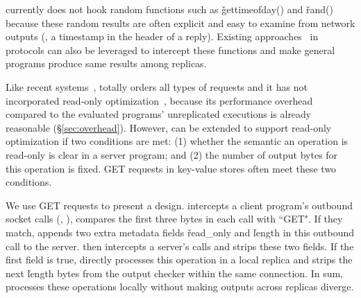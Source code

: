 
\xxx currently does not hook random functions such as \v{gettimeofday()} and 
\v{rand()} because these random results are often explicit and easy to examine 
from network outputs (\eg, a timestamp in the header of a reply). Existing 
approaches~\cite{eve:osdi12,paxos:practical} in \paxos protocols can also be 
leveraged to intercept these functions and make general programs produce same 
results among replicas.




Like recent systems~\cite{dare:hpdc15,crane:sosp15}, \xxx totally orders all 
types of requests and it has not incorporated 
read-only optimization~\cite{eve:osdi12}, because its performance overhead 
compared to the evaluated programs' unreplicated executions is already 
reasonable (\S\ref{sec:overhead}). However, \xxx can be extended to 
support read-only optimization if two conditions are met: (1) whether the 
semantic an operation is read-only is clear in a server program; and (2) the 
number of output bytes for this operation is fixed. GET requests in key-value 
stores often meet these two conditions.

We use GET requests to present a design. \xxx intercepts a client program's 
outbound socket calls (\eg, \send), compares the first three bytes in each call 
with ``GET". If they match, \xxx appends two extra \xxx metadata fields 
\v{read\_only} and \v{length} in this outbound call to the server. \xxx then 
intercepts a server's \recv calls and strips these two fields. If the first 
field is true, \xxx directly processes this operation in a local replica 
and strips the next \v{length} bytes from the output checker within the same
connection. In sum, \xxx processes these operations locally without making 
outputs across replicas diverge.

